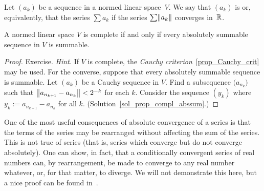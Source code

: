 \begin{defn}  Let $(a_k)$ be a sequence in a normed linear space~$V$.  We say that $(a_k)$ is
 or, equivalently, that the series $\sum a_k$
 if the series $\sum\lVert a_k\rVert$ converges in~$\mathbb{R}$.
\end{defn}

\begin{prop}\label{prop_compl_abssum}  A normed linear space $V$ is complete if and only if
every absolutely summable sequence in $V$ is summable.
\end{prop}


\begin{proof}  Exercise. \emph{Hint.}  If $V$ is complete, the \emph{Cauchy
criterion}~\ref{prop_Cauchy_crit} may be used.  For the converse, suppose that every
absolutely summable sequence is summable.  Let $(a_k)$ be a Cauchy sequence in $V$.  Find a
subsequence $\bigl(a_{n_k}\bigr)$ such that $\left\lVert a_{n_{k+1}} - a_{n_k}\right\rVert < 2^{-k}$ for
each $k$.  Consider the sequence $(y_k)$ where $y_k := a_{n_{k+1}} - a_{n_k}$ for all $k$.
(Solution~\ref{sol_prop_compl_abssum}.)  \ns
\end{proof}


%
%



One of the most useful consequences of absolute convergence of a series is that the terms of
the series may be rearranged without affecting the sum of the series.  This is not true of
 series (that is, series which converge but do not converge
absolutely).  One can show, in fact, that a conditionally convergent series of real numbers
can, by rearrangement, be made to converge to any real number whatever, or, for that matter,
to diverge. We will not demonstrate this here, but a nice proof can be found
in~\cite{Apostol:1974}.

